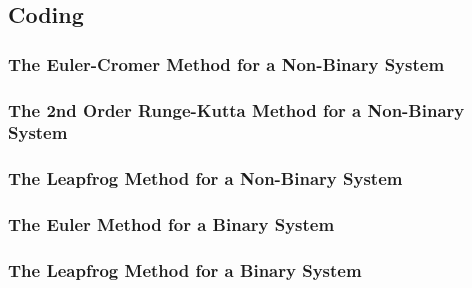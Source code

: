 \documentclass[11 pt, a4paper, twocolumn]{article}
\begin{document}
\subsection{Coding}
\subsubsection{The Euler-Cromer Method for a Non-Binary System}


\subsubsection{The 2nd Order Runge-Kutta Method for a Non-Binary System}


\subsubsection{The Leapfrog Method for a Non-Binary System}


\subsubsection{The Euler Method for a Binary System}


\subsubsection{The Leapfrog Method for a Binary System}

\end{document}
